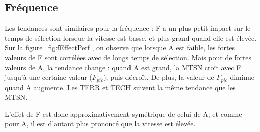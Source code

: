 	\subsection{Fréquence}
	\label{sub:freqEffect}
	Les tendances sont similaires pour la fréquence : F a un plus petit impact sur le temps de sélection lorsque la vitesse est basse, et plus grand quand elle est élevée. Sur la figure~\ref{fig:fEffectPerf}, on observe que lorsque A est faible, les fortes valeurs de F sont corrélées avec de longs temps de sélection. Mais pour de fortes valeurs de A, la tendance change : quand A est grand, la MTSN croît avec F jusqu'à une certaine valeur ($F_{pic}$), puis décroît. De plus, la valeur de $F_{pic}$ diminue quand A augmente. Les TERR et TECH suivent la même tendance que les MTSN.
	
	L'effet de F est donc approximativement symétrique de celui de A, et comme pour A, il est d'autant plus prononcé que la vitesse est élevée.

